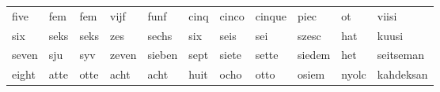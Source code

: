 \documentclass[a4paper, 20pt]{article}
\begin{document}
\begin{table}[]
\begin{tabular}{|lllllllllll|}
five                                                 & fem                                                   & fem                                                  & vijf                                                    & funf                                                 & cinq                                                   & cinco                                                  & cinque                                                 & piec                                                 & ot                                                    & viisi                                                \\
six                                                  & seks                                                  & seks                                                 & zes                                                     & sechs                                                & six                                                    & seis                                                   & sei                                                    & szesc                                                & hat                                                   & kuusi                                                \\
seven                                                & sju                                                   & syv                                                  & zeven                                                   & sieben                                               & sept                                                   & siete                                                  & sette                                                  & siedem                                               & het                                                   & seitseman                                            \\
eight                                                & atte                                                  & otte                                                 & acht                                                    & acht                                                 & huit                                                   & ocho                                                   & otto                                                   & osiem                                                & nyolc                                                 & kahdeksan                                            \\

\end{tabular}
\end{table}
\end{document}
